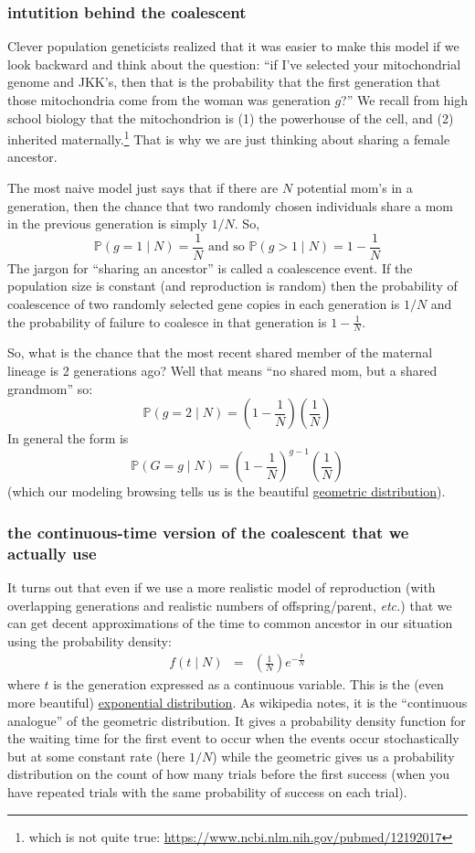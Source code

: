 \documentclass[11pt]{article}
\renewcommand{\Pr}{\mathbb{P}}
\newcommand{\href}[2]{\url{#2}}
\begin{document}
\subsubsection{intutition behind the coalescent}
Clever population geneticists realized that it was easier to make this model if
we look backward and think about the question: ``if I've selected your 
mitochondrial genome and JKK's, then that is the probability that the
first generation that those mitochondria come from the woman was generation $g$?''
We recall from high school biology that the mitochondrion is (1) the powerhouse of
the cell, and (2) inherited maternally.\footnote{which is not quite true: \url{https://www.ncbi.nlm.nih.gov/pubmed/12192017}}
That is why we are just thinking about sharing a female ancestor.

The most naive model just says that if there are $N$ potential mom's in a generation,
then the chance that two randomly chosen individuals share a mom in 
the previous generation is simply $1/N$.
So,
$$\Pr(g=1\mid N) = \frac{1}{N} \mbox{ and so } \Pr(g>1\mid N) = 1- \frac{1}{N} $$
The jargon for ``sharing an ancestor'' is called a coalescence event.
If the population size is constant (and reproduction is random) then
the probability of coalescence of two randomly selected gene copies in each generation is $1/N$ and the probability of failure to coalesce in that generation is $1- \frac{1}{N}$.

So, what is the chance that the most recent shared member of the maternal lineage is
2 generations ago?  
Well that means ``no shared mom, but a shared grandmom'' so:
$$\Pr(g=2\mid N) = \left(1 - \frac{1}{N}\right)\left(\frac{1}{N}\right)$$
In general the form is
$$\Pr(G=g\mid N) = \left(1 - \frac{1}{N}\right)^{g-1}\left(\frac{1}{N}\right)$$
(which our modeling browsing tells us is the beautiful 
\href{https://en.wikipedia.org/wiki/Geometric_distribution}{geometric distribution}).

\subsubsection{the continuous-time version  of the coalescent that we actually use}
It turns out that even if we use a more realistic model of reproduction (with overlapping generations and realistic numbers of offspring/parent, {\em etc.})
that we can get decent approximations of the time to common ancestor in 
our situation using the probability density:
\begin{eqnarray}
    f(t\mid N) & = & \left(\frac{1}{N}\right)e^{-\frac{t}{N}}
\end{eqnarray}
where $t$ is the generation expressed as a continuous variable.
This is the (even more beautiful) \href{https://en.wikipedia.org/wiki/Exponential_distribution}{exponential distribution}.
As wikipedia notes, it is the ``continuous analogue'' of the
geometric distribution. 
It gives a probability density function for the waiting time for the first
    event to occur when the events occur stochastically but 
    at some constant rate (here $1/N$)
while the geometric gives us a probability distribution 
    on the count of how many trials before the first success (when 
    you have repeated trials with the same probability of success on each trial).
\end{document}
